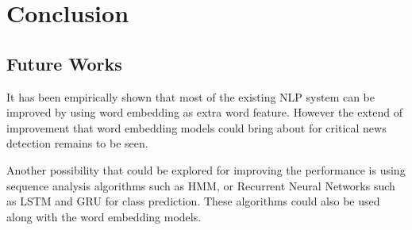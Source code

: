 \chapter{Conclusion}\label{conclusion}

\section{Future Works}
It has been empirically shown that most of the existing NLP system can be improved by using word embedding as extra word feature\cite{turian2010word}. However the extend of improvement that word embedding models could bring about for critical news detection remains to be   seen.\par
Another possibility that could be explored for improving the performance is using sequence analysis algorithms such as HMM\cite{baum1966statistical}, or Recurrent Neural Networks such as LSTM\cite{hochreiter1997long} and GRU\cite{cho2014learning} for class prediction. These algorithms could also be used along with the word embedding models.  

